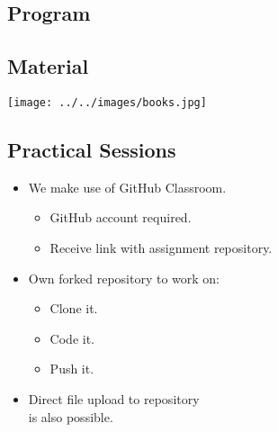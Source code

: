 \documentclass[aspectratio=1610,slidestop]{beamer}
\begin{document}
\subsection{Program}
\begin{pframe}
 \begin{center}
  
 \end{center}
\end{pframe}

\subsection{Material}
\begin{pframe}

 \begin{center}
   \texttt{[image: ../../images/books.jpg]}
 \end{center}
\end{pframe}

\subsection{Practical Sessions}
\begin{pframe}
 \begin{itemize}
  \item We make use of GitHub Classroom.
  \begin{itemize}
   \item GitHub account required.
   \item Receive link with assignment repository.
  \end{itemize}
  \item Own forked repository to work on:
  \begin{itemize}
   \item Clone it.
   \item Code it.
   \item Push it.
  \end{itemize}
  \item Direct file upload to repository\\
  is also possible.
 \end{itemize}
\end{pframe}
\end{document}

